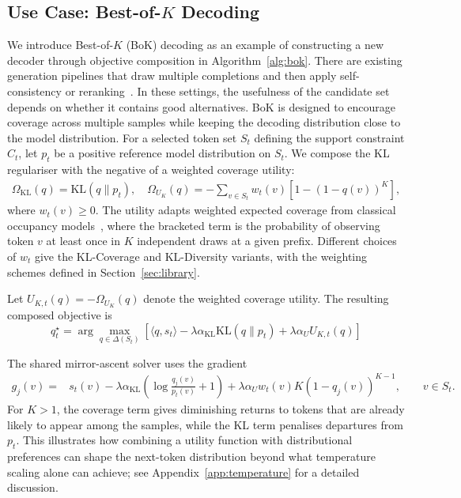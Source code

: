 \documentclass{article} %
\begin{document}
\subsection{Use Case: Best-of-\(K\) Decoding}
\label{subsec:bok}
We introduce Best-of-$K$ (BoK) decoding as an example of constructing a new decoder through objective composition in Algorithm~\ref{alg:bok}.
There are existing generation pipelines that draw multiple completions and then apply self-consistency or reranking~\citep{wang2023selfconsistencyimproveschainthought}.
In these settings, the usefulness of the candidate set depends on whether it contains good alternatives.
BoK is designed to encourage coverage across multiple samples while keeping the decoding distribution close to the model distribution. For a selected token set $S_t$ defining the support constraint $C_t$, let $p_t$ be a positive reference model distribution on $S_t$. We compose the KL regulariser with the negative of a weighted coverage utility:
\begin{equation}
\begin{aligned}
\Omega_{\mathrm{KL}}(q) = \mathrm{KL}(q\|p_t), \quad \Omega_{U_K}(q) = -\sum_{v\in S_t}w_t(v)\left[1-(1-q(v))^K\right],
\end{aligned}
\label{eq:bok-regularisers}
\end{equation}
where $w_t(v) \geq 0$. The utility adapts weighted expected coverage from classical occupancy models~\citep{boneh1997coupon}, where the bracketed term is the probability of observing token $v$ at least once in $K$ independent draws at a given prefix. Different choices of $w_t$ give the KL-Coverage and KL-Diversity variants, with the weighting schemes defined in Section~\ref{sec:library}.

Let $U_{K,t}(q)=-\Omega_{U_K}(q)$ denote the weighted coverage utility. The resulting composed objective is
\begin{equation}
q_t^\star
=
\arg\max_{q\in\Delta(S_t)}
\left[
\langle q,s_t\rangle
-
\lambda\alpha_{\mathrm{KL}}\mathrm{KL}(q\|p_t)
+
\lambda\alpha_U U_{K,t}(q)
\right]
\label{eq:bok-composed-objective}
\end{equation}

The shared mirror-ascent solver uses the gradient
\begin{equation}
\begin{aligned}
g_j(v)
={}&
s_t(v)
-
\lambda\alpha_{\mathrm{KL}}
\left(
\log\frac{q_j(v)}{p_t(v)}+1
\right)+
\lambda\alpha_U
w_t(v)K(1-q_j(v))^{K-1},
\qquad v\in S_t.
\end{aligned}
\label{eq:bok-gradient}
\end{equation}
For $K>1$, the coverage term gives diminishing returns to tokens
that are already likely to appear among the samples, while the KL term penalises departures from $p_t$. This illustrates how combining a utility function with distributional preferences can shape the next-token distribution beyond what temperature scaling alone can achieve; see Appendix~\ref{app:temperature} for a detailed discussion.
\end{document}

